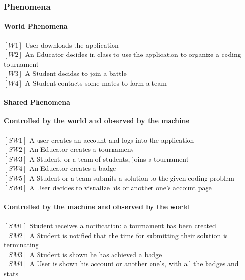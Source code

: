 \documentclass{article}
\begin{document}
      \subsubsection{Phenomena}
        {\setlength{\leftskip}{2em}
            \paragraph{World Phenomena}
            $[W1]$ User downloads the application\\
            $[W2]$ An Educator decides in class to use the application to organize a coding tournament\\
            $[W3]$ A Student decides to join a battle\\
            $[W4]$ A Student contacts some mates to form a team

            \paragraph{Shared Phenomena}
            \textbf{Controlled by the world and observed by the machine} \\\\
            $[SW1]$ A user creates an account and logs into the application\\
            $[SW2]$ An Educator creates a tournament\\
            $[SW3]$ A Student, or a team of students, joins a tournament\\
            $[SW4]$ An Educator creates a badge\\
            $[SW5]$ A Student or a team submits a solution to the given coding problem\\
            $[SW6]$ A User decides to visualize his or another one's account page
\\\\
            \textbf{Controlled by the machine and observed by the world}\\\\
            $[SM1]$ Student receives a notification: a tournament has been created \\
            $[SM2]$ A Student is notified that the time for submitting their solution is terminating\\
            $[SM3]$ A Student is shown he has achieved a badge\\
            $[SM4]$ A User is shown his account or another one's, with all the badges and stats

            }
\end{document}
